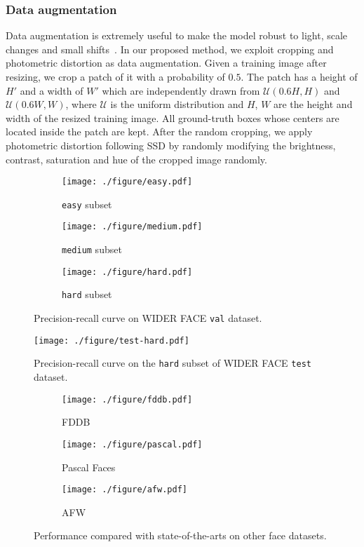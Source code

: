 \documentclass[10pt,twocolumn,letterpaper]{article}
\begin{document}
\subsubsection*{Data augmentation}\label{section:data_augmentation}
Data augmentation is extremely useful to make the model robust to light, scale changes and
small shifts~\cite{liu2016ssd,Tang_2018_ECCV}.
In our proposed method, we exploit cropping and photometric distortion as data
augmentation. Given a training image after resizing,
we crop a patch of it with a probability of
$0.5$. The patch has a height of $H'$ and a width of $W'$ which are independently drawn from
$\mathcal{U}(0.6H,H)$ and $\mathcal{U}(0.6W,W)$, where $\mathcal{U}$ is the uniform
distribution and $H$, $W$ are the height and width of the resized training image. All
ground-truth boxes whose centers are located inside the patch are kept.
After the random cropping, we apply photometric distortion following SSD by randomly modifying the brightness, contrast, saturation and
hue of the cropped image randomly.
\begin{figure*}[!t]
  \centering
  \begin{subfigure}[b]{0.33\linewidth}
    \centering\texttt{[image: ./figure/easy.pdf]}
    \caption*{\texttt{easy} subset}
  \end{subfigure}
   \begin{subfigure}[b]{0.33\linewidth}
    \centering\texttt{[image: ./figure/medium.pdf]}
    \caption*{\texttt{medium} subset}
  \end{subfigure}\begin{subfigure}[b]{0.33\linewidth}
    \centering\texttt{[image: ./figure/hard.pdf]}
    \caption*{\texttt{hard} subset}
  \end{subfigure}\caption{Precision-recall curve on WIDER FACE \texttt{val} dataset.}
\label{fig:perf_widerface}
\end{figure*}

\begin{figure}[!t]
    \centering\texttt{[image: ./figure/test-hard.pdf]}
\caption{Precision-recall curve on the \texttt{hard} subset of WIDER FACE \texttt{test} dataset.}
\label{fig:perf_widerface_test}
\end{figure}

\begin{figure*}[!t]
  \centering
\begin{subfigure}[b]{0.33\linewidth}
    \centering\texttt{[image: ./figure/fddb.pdf]}
    \caption{FDDB}\label{fig:fddb}
  \end{subfigure}
    \begin{subfigure}[b]{0.33\linewidth}
    \centering\texttt{[image: ./figure/pascal.pdf]}
    \caption{Pascal Faces}\label{fig:pascal}
  \end{subfigure}\begin{subfigure}[b]{0.33\linewidth}
    \centering\texttt{[image: ./figure/afw.pdf]}
    \caption{AFW}\label{fig:afw}
  \end{subfigure}
\caption{Performance compared with state-of-the-arts on other face datasets.}
\label{fig:perf_other}
\end{figure*}
\end{document}
